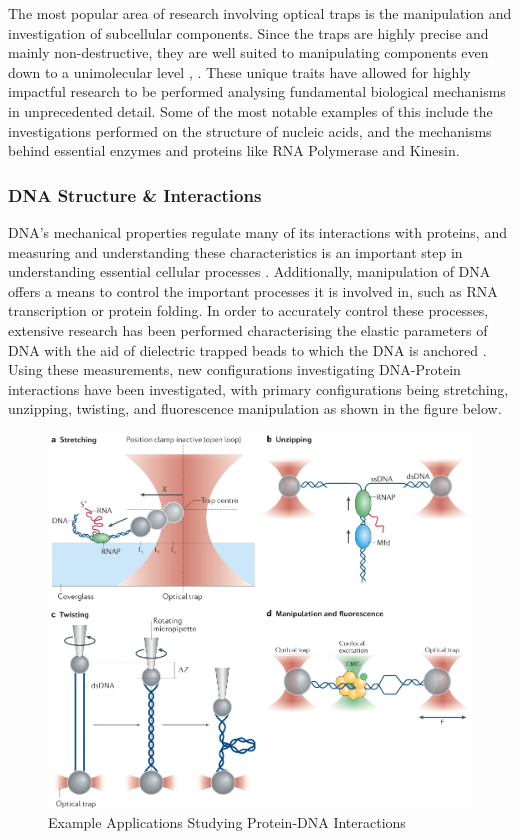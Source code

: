\documentclass{article}
\begin{document}
The most popular area of research involving optical traps is the manipulation and investigation of subcellular components. Since the traps are highly precise and mainly non-destructive, they are well suited to manipulating components even down to a unimolecular level \cite{Bustamante2021}, \cite{2018_Polimeno}. These unique traits have allowed for highly impactful research to be performed analysing fundamental biological mechanisms in unprecedented detail. Some of the most notable examples of this include the investigations performed on the structure of nucleic acids, and the mechanisms behind essential enzymes and proteins like RNA Polymerase and Kinesin.



\subsubsection*{DNA Structure \& Interactions}

DNA's mechanical properties regulate many of its interactions with proteins, and measuring and understanding these characteristics is an important step in understanding essential cellular processes \cite{Bustamante2021}. Additionally, manipulation of DNA offers a means to control the important processes it is involved in, such as RNA transcription or protein folding. In order to accurately control these processes, extensive research has been performed characterising the elastic parameters of DNA with the aid of dielectric trapped beads to which the DNA is anchored \cite{Lang2003-ll}. Using these measurements, new configurations investigating DNA-Protein interactions have been investigated, with primary configurations being stretching, unzipping, twisting, and fluorescence manipulation as shown in the figure below.

\begin{figure}[h!]
    \begin{center}
    \includegraphics[width=0.5\linewidth]{Pictures/applications.png}
    \caption{Example Applications Studying Protein-DNA Interactions}
    \label{fig:app}
    \end{center}
\end{figure}
\newpage
\end{document}
